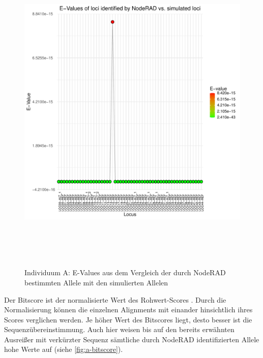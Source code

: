 \begin{figure}[H]
	\begin{center}
		\includegraphics[height=16cm]{bilder/evaluation/evalues/A.plot_evalues.pdf}
		\caption{Individuum A: E-Values aus dem Vergleich der durch NodeRAD bestimmten Allele mit den simulierten Allelen}
		\label{fig:a-eval}
	\end{center}
\end{figure}

Der Bitscore ist der normalisierte Wert des Rohwert-Scores \cite{gaedeke_2007}. Durch die Normalisierung können die einzelnen Alignments mit einander hinsichtlich ihres Scores verglichen werden. Je höher Wert des Bitscores liegt, desto besser ist die Sequenzübereinstimmung. Auch hier weisen bis auf den bereits erwähnten Ausreißer mit verkürzter Sequenz sämtliche durch NodeRAD identifizierten Allele hohe Werte auf (siehe \autoref{fig:a-bitscore}).

